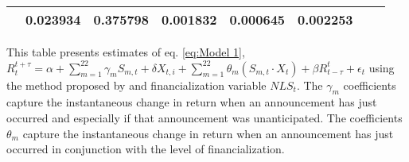 \begin{sidewaystable}
{\begin{tabular}{@{}lllllllllllll@{}}
                           & \multicolumn{2}{c}{ 0.023934 }                                                 & \multicolumn{2}{c}{ 0.375798 }                                                 & \multicolumn{2}{c}{ 0.001832 }                                                 & \multicolumn{2}{c}{ 0.000645 }                                                   & \multicolumn{2}{c}{ 0.002253 }                                                 \\ \bottomrule 
\end{tabular}
}
\begin{tablenotes}\item 
    \singlespacing
    \footnotesize
    This table presents estimates of eq. \ref{eq:Model 1}, $R_{t}^{t+\tau}=\alpha+\sum_{m=1}^{22} \gamma_m S_{m,t}+ \delta X_{t,i} + \sum_{m=1}^{22} \theta_m (S_{m,t} \cdot X_t)+\beta R_{t-\tau}^{t}+\epsilon_{t}$ using the method proposed by \citet{kurov2019price} and financialization variable $NLS_t$. The $\gamma_m$ coefficients capture the instantaneous change in return when an announcement has just occurred and especially if that announcement was unanticipated. The coefficients $\theta_m$ capture the instantaneous change in return when an announcement has just occurred in conjunction with the level of financialization.
\end{tablenotes}
\end{sidewaystable}


